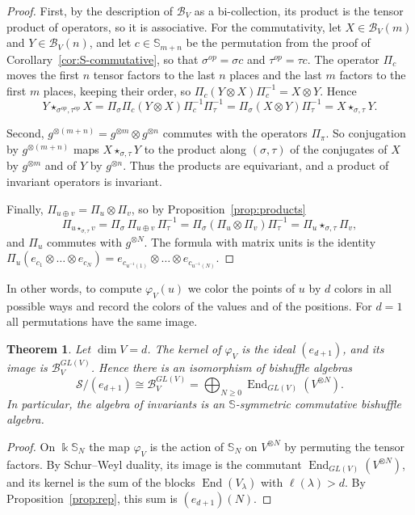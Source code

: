 \documentclass[11pt]{amsart}
\newtheorem{theorem}{Theorem}[section]
\theoremstyle{definition}
\theoremstyle{remark}
\newcommand{\bS}{\mathbb{S}}
\newcommand{\kk}{\Bbbk}
\newcommand{\cB}{\mathcal{B}}
\newcommand{\cS}{\mathscr{S}}
\newcommand{\End}{\operatorname{End}}
\begin{document}
\begin{proof}
First, by the description of $\cB_V$ as a bi-collection, its product is the tensor product of operators, so it is associative. For the commutativity, let $X\in\cB_V(m)$ and $Y\in\cB_V(n)$, and let $c\in\bS_{m+n}$ be the permutation from the proof of Corollary~\ref{cor:S-commutative}, so that $\sigma^{op}=\sigma c$ and $\tau^{op}=\tau c$. The operator $\Pi_c$ moves the first $n$ tensor factors to the last $n$ places and the last $m$ factors to the first $m$ places, keeping their order, so $\Pi_c(Y\otimes X)\Pi_c^{-1}=X\otimes Y$. Hence
\[
Y\star_{\sigma^{op},\tau^{op}}X=\Pi_\sigma\Pi_c(Y\otimes X)\Pi_c^{-1}\Pi_\tau^{-1}=\Pi_\sigma(X\otimes Y)\Pi_\tau^{-1}=X\star_{\sigma,\tau}Y .
\]

Second, $g^{\otimes(m+n)}=g^{\otimes m}\otimes g^{\otimes n}$ commutes with the operators $\Pi_\pi$. So conjugation by $g^{\otimes(m+n)}$ maps $X\star_{\sigma,\tau}Y$ to the product along $(\sigma,\tau)$ of the conjugates of $X$ by $g^{\otimes m}$ and of $Y$ by $g^{\otimes n}$. Thus the products are equivariant, and a product of invariant operators is invariant.

Finally, $\Pi_{u\oplus v}=\Pi_u\otimes\Pi_v$, so by Proposition~\ref{prop:products}
\[
\Pi_{u\star_{\sigma,\tau}v}=\Pi_\sigma\,\Pi_{u\oplus v}\,\Pi_\tau^{-1}=\Pi_\sigma(\Pi_u\otimes\Pi_v)\Pi_\tau^{-1}=\Pi_u\star_{\sigma,\tau}\Pi_v ,
\]
and $\Pi_u$ commutes with $g^{\otimes N}$. The formula with matrix units is the identity $\Pi_u(e_{c_1}\otimes\dots\otimes e_{c_N})=e_{c_{u^{-1}(1)}}\otimes\dots\otimes e_{c_{u^{-1}(N)}}$.
\end{proof}

In other words, to compute $\varphi_V(u)$ we color the points of $u$ by $d$ colors in all possible ways and record the colors of the values and of the positions. For $d=1$ all permutations have the same image.

\begin{theorem}\label{thm:SW}
Let $\dim V=d$. The kernel of $\varphi_V$ is the ideal $(e_{d+1})$, and its image is $\cB_V^{GL(V)}$. Hence there is an isomorphism of bishuffle algebras
\[
\cS/(e_{d+1})\cong\cB_V^{GL(V)}=\bigoplus_{N\ge0}\End_{GL(V)}(V^{\otimes N}).
\]
In particular, the algebra of invariants is an $\bS$-symmetric commutative bishuffle algebra.
\end{theorem}

\begin{proof}
On $\kk\bS_N$ the map $\varphi_V$ is the action of $\bS_N$ on $V^{\otimes N}$ by permuting the tensor factors. By Schur--Weyl duality, its image is the commutant $\End_{GL(V)}(V^{\otimes N})$, and its kernel is the sum of the blocks $\End(V_\lambda)$ with $\ell(\lambda)>d$. By Proposition~\ref{prop:rep}, this sum is $(e_{d+1})(N)$.
\end{proof}
\end{document}

